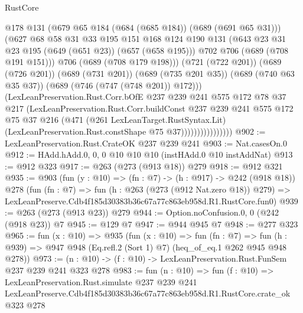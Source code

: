 \begin{lexlean}{RustCore}
\begin{coremodule}
                                @178
                                @131
                                (@679 @65 @184 (@684 (@685 @184)) (@689 (@691 @65 @31)))
                                (@627
                                  @68
                                  @58
                                  @31
                                  @33
                                  @195
                                  @151
                                  @168
                                  @124
                                  @190
                                  @131
                                  (@643 @23 @31 @23 @195 (@649 (@651 @23)) (@657 (@658 @195)))
                                  @702
                                  @706
                                  (@689 (@708 @191 @151)))
                                @706
                                (@689 (@708 @179 @198)))
                              (@721 (@722 @201))
                              (@689 (@726 @201))
                              (@689 (@731 @201))
                              (@689 (@735 @201 @35))
                              (@689 (@740 @63 @35 @37))
                              (@689 (@746 (@747 (@748 @201)) @172)))
                            (LexLeanPreservation.Rust.Corr.bOfE
                              @237
                              @239
                              @241
                              @575
                              @172
                              @78
                              @37
                              @217
                              (LexLeanPreservation.Rust.Corr.buildConst
                                @237
                                @239
                                @241
                                @575
                                @172
                                @75
                                @37
                                @216
                                (@471
                                  (@261 LexLeanTarget.RustSyntax.Lit)
                                  (LexLeanPreservation.Rust.constShape @75 @37))))))))))))))))
@902 := LexLeanPreservation.Rust.CrateOK @237 @239 @241
@903 := Nat.casesOn.{0}
@912 := HAdd.hAdd.{0, 0, 0} @10 @10 @10 (instHAdd.{0} @10 instAddNat)
@913 := @912 @323
@917 := @263 (@273 (@913 @18)) @279
@918 := @912 @321
@935 := @903
    (fun (y : @10) => (fn : @7) -> (h : @917) -> @242 (@918 @18))
    @278
    (fun (fn : @7) =>
    fun (h : @263 (@273 (@912 Nat.zero @18)) @279) =>
    LexLeanPreserve.Cdb4f185d30383b36c67a77c863eb958d.R1.RustCore.fun0)
@939 := @263 (@273 (@913 @23)) @279
@944 := Option.noConfusion.{0, 0} (@242 (@918 @23)) @7
@945 := @129 @7
@947 := @944 @945 @7
@948 := @277 @323
@965 := fun (x : @10) =>
  @935
    (fun (x : @10) =>
    fun (fn : @7) =>
    fun (h : @939) => @947 @948 (Eq.refl.{2} (Sort 1) @7) (heq_of_eq.{1} @262 @945 @948 @278))
@973 := (n : @10) -> (f : @10) -> LexLeanPreservation.Rust.FunSem @237 @239 @241 @323 @278
@983 := fun (n : @10) =>
  fun (f : @10) =>
  LexLeanPreservation.Rust.simulate
    @237
    @239
    @241
    LexLeanPreserve.Cdb4f185d30383b36c67a77c863eb958d.R1.RustCore.crate_ok
    @323
    @278
\end{coremodule}
\end{lexlean}
